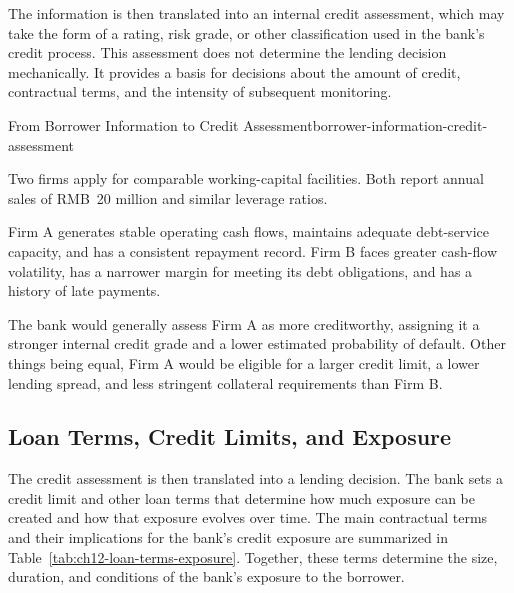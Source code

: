 The information is then translated into an internal credit assessment, which may take the form of a rating, risk grade, or other classification used in the bank's credit process. This assessment does not determine the lending decision mechanically. It provides a basis for decisions about the amount of credit, contractual terms, and the intensity of subsequent monitoring.

\begin{example}{From Borrower Information to Credit Assessment}{borrower-information-credit-assessment}

Two firms apply for comparable working-capital facilities. Both report annual sales of RMB~20 million and similar leverage ratios.

Firm A generates stable operating cash flows, maintains adequate debt-service capacity, and has a consistent repayment record. Firm B faces greater cash-flow volatility, has a narrower margin for meeting its debt obligations, and has a history of late payments.

The bank would generally assess Firm A as more creditworthy, assigning it a stronger internal credit grade and a lower estimated probability of default. Other things being equal, Firm A would be eligible for a larger credit limit, a lower lending spread, and less stringent collateral requirements than Firm B.

\end{example}



\subsection{Loan Terms, Credit Limits, and Exposure}

The credit assessment is then translated into a lending decision. The bank sets a credit limit and other loan terms that determine how much exposure can be created and how that exposure evolves over time. The main contractual terms and their implications for the bank's credit exposure are summarized in Table~\ref{tab:ch12-loan-terms-exposure}. Together, these terms determine the size, duration, and conditions of the bank's exposure to the borrower.

